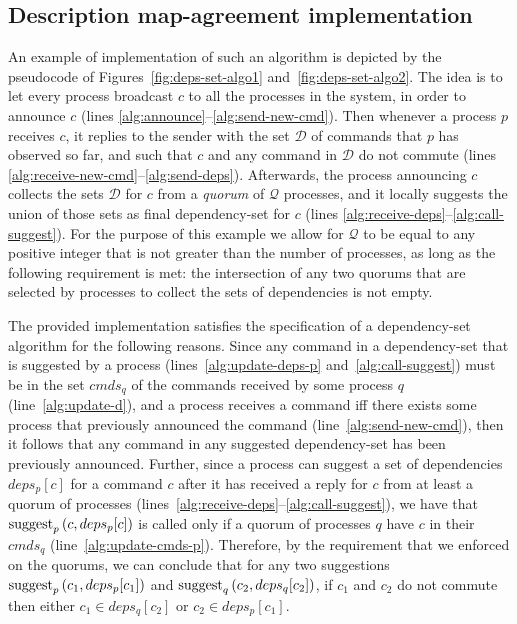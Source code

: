 \subsection{Description map-agreement implementation}

An example of implementation of such an algorithm is depicted by the pseudocode of Figures~\ref{fig:deps-set-algo1} and~\ref{fig:deps-set-algo2}. The idea is to let every process broadcast $c$ to all the processes in the system, in order to announce $c$ (lines \ref{alg:announce}--\ref{alg:send-new-cmd}). Then whenever a process $p$ receives $c$, it replies to the sender with the set $\mathcal{D}$ of commands that $p$ has observed so far, and such that $c$ and any command in $\mathcal{D}$ do not commute (lines \ref{alg:receive-new-cmd}--\ref{alg:send-deps}). Afterwards, the process announcing $c$ collects the sets $\mathcal{D}$ for $c$ from a \textit{quorum} of $\mathcal{Q}$ processes, and it locally suggests the union of those sets as final dependency-set for $c$ (lines \ref{alg:receive-deps}--\ref{alg:call-suggest}). For the purpose of this example we allow for $\mathcal{Q}$ to be equal to any positive integer that is not greater than the number of processes, as long as the following requirement is met: the intersection of any two quorums that are selected by processes to collect the sets of dependencies is not empty.

The provided implementation satisfies the specification of a dependency-set algorithm for the following reasons. Since any command in a dependency-set that is suggested by a process (lines~\ref{alg:update-deps-p} and~\ref{alg:call-suggest}) must be in the set $cmds_q$ of the commands received by some process $q$ (line~\ref{alg:update-d}), and a process receives a command iff there exists some process that previously announced the command (line~\ref{alg:send-new-cmd}), then it follows that any command in any suggested dependency-set has been previously announced. Further, since a process can suggest a set of dependencies $deps_p[c]$ for a command $c$ after it has received a reply for $c$ from at least a quorum of processes (lines~\ref{alg:receive-deps}--\ref{alg:call-suggest}), we have that $\operatorname{suggest}_p \left( c,deps_p[c]\right)$ is called only if a quorum of processes $q$ have $c$ in their $cmds_q$ (line~\ref{alg:update-cmds-p}). Therefore, by the requirement that we enforced on the quorums, we can conclude that for any two suggestions $\operatorname{suggest}_p \left( c_1,deps_p[c_1]\right)$ and $\operatorname{suggest}_q \left( c_2,deps_q[c_2]\right)$,  if $c_1$ and $c_2$ do not commute then either $c_1\in deps_q[c_2]$ or $c_2 \in deps_p[c_1]$.



